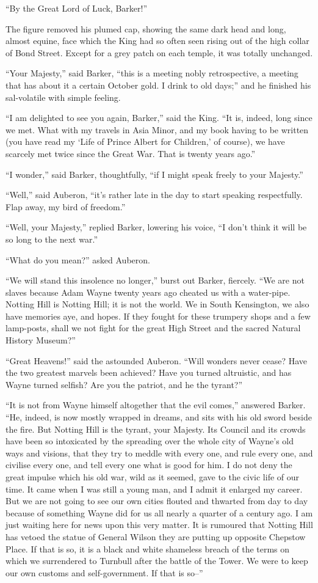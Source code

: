 \documentclass{book}
\begin{document}
“By the Great Lord of Luck, Barker!”

The figure removed his plumed cap, showing the same dark head and long, almost equine, face which the King had so often seen rising out of the high collar of Bond Street. Except for a grey patch on each temple, it was totally unchanged.

“Your Majesty,” said Barker, “this is a meeting nobly retrospective, a meeting that has about it a certain October gold. I drink to old days;” and he finished his sal-volatile with simple feeling.

“I am delighted to see you again, Barker,” said the King. “It is, indeed, long since we met. What with my travels in Asia Minor, and my book having to be written (you have read my ‘Life of Prince Albert for Children,’ of course), we have scarcely met twice since the Great War. That is twenty years ago.”

“I wonder,” said Barker, thoughtfully, “if I might speak freely to your Majesty.”

“Well,” said Auberon, “it’s rather late in the day to start speaking respectfully. Flap away, my bird of freedom.”

“Well, your Majesty,” replied Barker, lowering his voice, “I don’t think it will be so long to the next war.”

“What do you mean?” asked Auberon.

“We will stand this insolence no longer,” burst out Barker, fiercely. “We are not slaves because Adam Wayne twenty years ago cheated us with a water-pipe. Notting Hill is Notting Hill; it is not the world. We in South Kensington, we also have memories aye, and hopes. If they fought for these trumpery shops and a few lamp-posts, shall we not fight for the great High Street and the sacred Natural History Museum?”

“Great Heavens!” said the astounded Auberon. “Will wonders never cease? Have the two greatest marvels been achieved? Have you turned altruistic, and has Wayne turned selfish? Are you the patriot, and he the tyrant?”

“It is not from Wayne himself altogether that the evil comes,” answered Barker. “He, indeed, is now mostly wrapped in dreams, and sits with his old sword beside the fire. But Notting Hill is the tyrant, your Majesty. Its Council and its crowds have been so intoxicated by the spreading over the whole city of Wayne’s old ways and visions, that they try to meddle with every one, and rule every one, and civilise every one, and tell every one what is good for him. I do not deny the great impulse which his old war, wild as it seemed, gave to the civic life of our time. It came when I was still a young man, and I admit it enlarged my career. But we are not going to see our own cities flouted and thwarted from day to day because of something Wayne did for us all nearly a quarter of a century ago. I am just waiting here for news upon this very matter. It is rumoured that Notting Hill has vetoed the statue of General Wilson they are putting up opposite Chepstow Place. If that is so, it is a black and white shameless breach of the terms on which we surrendered to Turnbull after the battle of the Tower. We were to keep our own customs and self-government. If that is so–”
\end{document}
